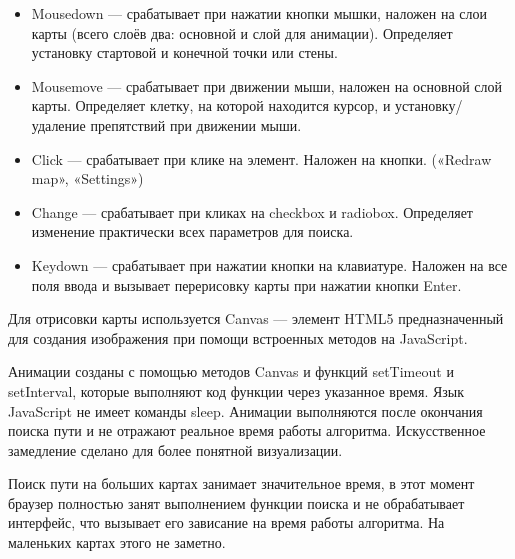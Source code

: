 \begin{itemize}
\item Mousedown — срабатывает при нажатии кнопки мышки, наложен на слои карты (всего слоёв два: основной и слой для анимации). Определяет установку стартовой и конечной точки или стены.
\item Mousemove — срабатывает при движении мыши, наложен на основной слой карты. Определяет клетку, на которой находится курсор, и установку/удаление препятствий при движении мыши.
\item Click — срабатывает при клике на элемент. Наложен на кнопки. («Redraw map», «Settings»)
\item Change — срабатывает при кликах на checkbox и radiobox. Определяет изменение практически всех параметров для поиска.
\item Keydown — срабатывает при нажатии кнопки на клавиатуре. Наложен на все поля ввода и вызывает перерисовку карты при нажатии кнопки Enter.
\end{itemize}

Для отрисовки карты используется Canvas — элемент HTML5 предназначенный для создания изображения при помощи встроенных методов на JavaScript.

Анимации созданы с помощью методов Canvas и функций setTimeout и setInterval, которые выполняют код функции через указанное время. Язык JavaScript не имеет команды sleep. Анимации выполняются после окончания поиска пути и не отражают реальное время работы алгоритма. Искусственное замедление сделано для более понятной визуализации.

Поиск пути на больших картах занимает значительное время, в этот момент браузер полностью занят выполнением функции поиска и не обрабатывает интерфейс, что вызывает его зависание на время работы алгоритма. На маленьких картах этого не заметно.

